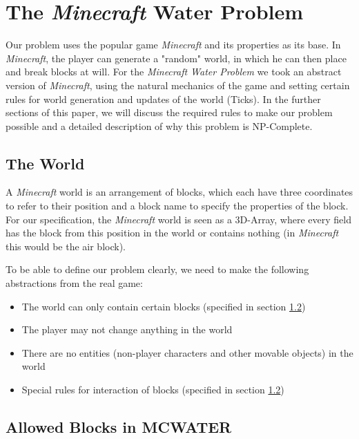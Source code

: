 \section{The \textit{Minecraft} Water Problem}

\noindent Our problem uses the popular game \textit{Minecraft} and its properties as its base. In \textit{Minecraft}, the player can generate a "random" world, in which he can then place and break blocks at will. For the \textit{Minecraft Water Problem} we took an abstract version of \textit{Minecraft}, using the natural mechanics of the game and setting certain rules for world generation and updates of the world (Ticks). In the further sections of this paper, we will discuss the required rules to make our problem possible and a detailed description of why this problem is NP-Complete.

\subsection{The World} 

\noindent A \textit{Minecraft} world is an arrangement of blocks, which each have three coordinates to refer to their position and a block name to specify the properties of the block. For our specification, the \textit{Minecraft} world is seen as a 3D-Array, where every field has the block from this position in the world or contains nothing (in \textit{Minecraft} this would be the air block). 

\noindent To be able to define our problem clearly, we need to make the following abstractions from the real game:

\begin{itemize}
    \item The world can only contain certain blocks (specified in section \ref{blocks})
    \item The player may not change anything in the world
    \item There are no entities (non-player characters and other movable objects) in the world
    \item Special rules for interaction of blocks (specified in section \ref{blocks})
\end{itemize}

\subsection{Allowed Blocks in \textbf{MCWATER}} \label{blocks}

